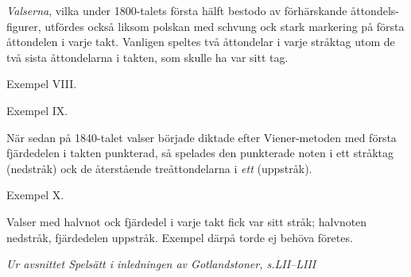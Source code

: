 \thispagestyle{empty}
\vspace*{2cm}
\begin{adjustwidth*}{19.5mm}{19.5mm}
\setlength{\parindent}{0em}

\textit{Valserna}, vilka under 1800-talets första hälft bestodo
av förhärskande åttondels-figurer, utfördes också liksom polskan
med schvung ock stark markering på första åttondelen i
varje takt. Vanligen speltes två åttondelar i varje \guillemotright{}stråktag\guillemotright{}
utom de två sista åttondelarna i takten, som skulle ha var
sitt \guillemotright{}tag\guillemotright{}.

\vspace{5mm}

Exempel VIII.


Exempel IX.


När sedan på 1840-talet valser började diktade efter Viener-metoden
med första fjärdedelen i takten punkterad, så spelades
den punkterade noten i ett \guillemotright{}stråktag\guillemotright{} (nedstråk) ock de
återstående treåttondelarna i \textit{ett} (uppstråk).

\vspace{5mm}

Exempel X.


Valser med halvnot ock fjärdedel i varje takt fick var
sitt \guillemotright{}stråk\guillemotright{}; halvnoten nedstråk, fjärdedelen uppstråk. Exempel
därpå torde ej behöva företes.

\vspace{18mm}


\textit{Ur avsnittet \guillemotright{}Spelsätt\guillemotright{} i inledningen av Gotlandstoner, s.\@ LII--LIII}

\end{adjustwidth*}

